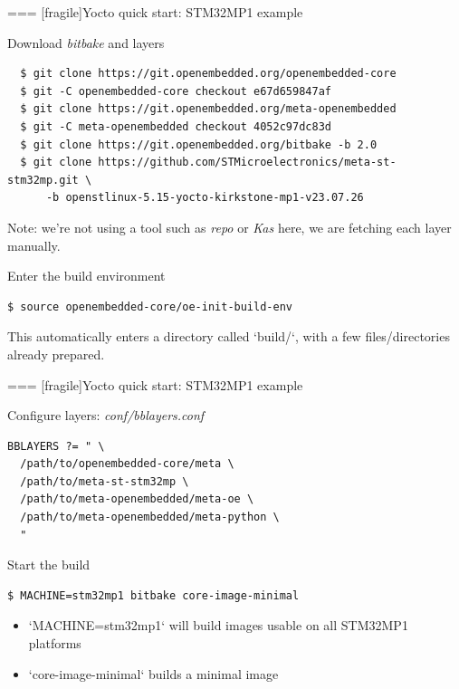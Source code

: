 === [fragile]{Yocto quick start: STM32MP1 example}
  \begin{block}{Download {\em bitbake} and layers}
    {\footnotesize
\begin{verbatim}
  $ git clone https://git.openembedded.org/openembedded-core
  $ git -C openembedded-core checkout e67d659847af
  $ git clone https://git.openembedded.org/meta-openembedded
  $ git -C meta-openembedded checkout 4052c97dc83d
  $ git clone https://git.openembedded.org/bitbake -b 2.0
  $ git clone https://github.com/STMicroelectronics/meta-st-stm32mp.git \
      -b openstlinux-5.15-yocto-kirkstone-mp1-v23.07.26
\end{verbatim}
    }
  \end{block}

  Note: we're not using a tool such as {\em repo} or {\em Kas} here,
  we are fetching each layer manually.

  \begin{block}{Enter the build environment}
    {\footnotesize
\begin{verbatim}
$ source openembedded-core/oe-init-build-env
\end{verbatim}
    }
  \end{block}

  This automatically enters a directory called `build/`, with a
  few files/directories already prepared.


=== [fragile]{Yocto quick start: STM32MP1 example}
  \begin{block}{Configure layers: {\em conf/bblayers.conf}}
    {\footnotesize
\begin{verbatim}
BBLAYERS ?= " \
  /path/to/openembedded-core/meta \
  /path/to/meta-st-stm32mp \
  /path/to/meta-openembedded/meta-oe \
  /path/to/meta-openembedded/meta-python \
  "
\end{verbatim}
    }
  \end{block}

  \begin{block}{Start the build}
    {\footnotesize
\begin{verbatim}
$ MACHINE=stm32mp1 bitbake core-image-minimal
\end{verbatim}
    }
  \end{block}

  \begin{itemize}
  \item `MACHINE=stm32mp1` will build images usable on all
    STM32MP1 platforms
  \item `core-image-minimal` builds a minimal image
  \end{itemize}

